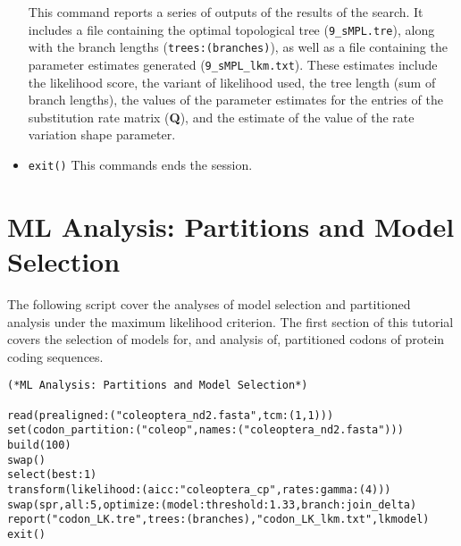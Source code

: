 \begin{itemize}
This command reports a series of outputs of the results of the
search.  It includes a file containing the optimal topological
tree (\texttt{9\_sMPL.tre}), along with the branch lengths
(\texttt{trees:(branches)}), as well as a file containing the
parameter estimates generated (\texttt{9\_sMPL\_lkm.txt}). These
estimates include the likelihood score, the variant of likelihood
used, the tree length (sum of branch lengths), the values of the
parameter estimates for the entries of the substitution rate matrix
(\textbf{Q}), and the estimate of the value of the rate variation
shape parameter.  
\item \texttt{exit()}  This commands ends the \poy session.

\end{itemize}


\section{ML Analysis: Partitions and Model Selection}{\label{tutorial16}}

The following script cover the analyses of model selection and partitioned analysis under 
the maximum likelihood criterion. The first section of this tutorial covers the selection 
of models for, and analysis of, partitioned codons of protein coding sequences. 

\begin{verbatim}
(*ML Analysis: Partitions and Model Selection*) 

read(prealigned:("coleoptera_nd2.fasta",tcm:(1,1)))
set(codon_partition:("coleop",names:("coleoptera_nd2.fasta")))
build(100)
swap()
select(best:1)
transform(likelihood:(aicc:"coleoptera_cp",rates:gamma:(4)))
swap(spr,all:5,optimize:(model:threshold:1.33,branch:join_delta)
report("codon_LK.tre",trees:(branches),"codon_LK_lkm.txt",lkmodel)
exit()
\end{verbatim}

